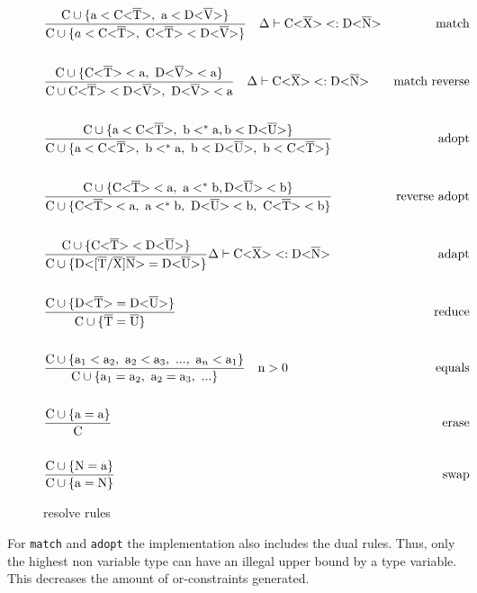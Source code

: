 \begin{figure}[tp]
    \begin{align*}
        &\frac{\cand \{ \text{a} < \nvt{C}{T}, \ \text{a} < \nvt{D}{V} \} }{ \cand \{ a < \nvt{C}{T}, \ \nvt{C}{T} < \nvt{D}{V} \} } \quad \Delta \vdash \nvt{C}{X} <: \nvt{D}{N} &\text{match}\\
        \\
        &\frac{\cand \{ \nvt{C}{T} < \text{a}, \ \nvt{D}{V} < \text{a} \} }{ \cand \nvt{C}{T} < \nvt{D}{V}, \ \nvt{D}{V} < \text{a} } \quad \Delta \vdash \nvt{C}{X} <: \nvt{D}{N} &\text{match reverse}\\
        \\
        &\frac{\cand \{ \text{a} < \nvt{C}{T}, \ \text{b} <^* \text{a}, \text{b} < \nvt{D}{U}  \} }{ \cand \{ \text{a} < \nvt{C}{T}, \ \text{b} <^* \text{a}, \ \text{b} < \nvt{D}{U}, \ \text{b} < \nvt{C}{T} \} } &\text{adopt}\\
        \\
        &\frac{\cand \{ \nvt{C}{T} < \text{a}, \ \text{a} <^* \text{b}, \nvt{D}{U} < \text{b} \} }{ \cand \{\nvt{C}{T} < \text{a}, \ \text{a} <^* \text{b}, \ \nvt{D}{U} < \text{b}, \ \nvt{C}{T} < \text{b} \} } &\text{reverse adopt}\\
        \\
        &\frac{\cand \{ \nvt{C}{T} < \nvt{D}{U} \} }{ \cand \{ \text{D<} \tsxsns{T}{X}{N} \text{>} = \nvt{D}{U} \} } \Delta \vdash \nvt{C}{X} <: \nvt{D}{N} &\text{adapt} \\
        \\
        &\frac{\cand \{ \nvt{D}{T} = \nvt{D}{U} \} }{\cand \{ \ot{T} = \ot{U} \} } &\text{reduce} \\
        \\
        &\frac{\cand \{ \text{a}_1 < \text{a}_2, \ \text{a}_2 < \text{a}_3, \ ..., \ \text{a}_n < \text{a}_1 \} }{\cand \{ \text{a}_1 = \text{a}_2, \ \text{a}_2 = \text{a}_3, \ ... \} } \quad \text{n} > 0 &\text{equals} \\
        \\
        &\frac{\cand \{ \text{a} = \text{a} \} }{\text{C}} &\text{erase} \\
        \\
        &\frac{\cand \{ \text{N} = \text{a} \} }{\cand \{ \text{a} = \text{N} \} } &\text{swap}
    \end{align*}
    \caption{resolve rules}
    \label{resolve_rules}
\end{figure}

For \verb|match| and \verb|adopt| the implementation also includes the dual rules.
Thus, only the highest non variable type can have an illegal upper bound by a type variable.
This decreases the amount of or-constraints generated.

